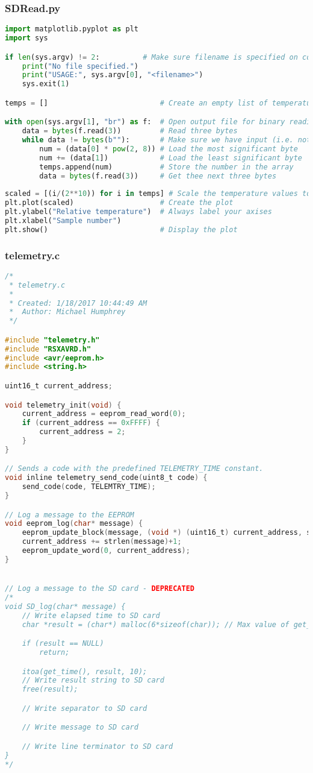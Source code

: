 \subsubsection{SDRead.py}
\begin{lstlisting}[language=Python]
import matplotlib.pyplot as plt
import sys

if len(sys.argv) != 2:			# Make sure filename is specified on command line
	print("No file specified.")	
	print("USAGE:", sys.argv[0], "<filename>")
	sys.exit(1)

temps = []							# Create an empty list of temperatures

with open(sys.argv[1], "br") as f:	# Open output file for binary reading
	data = bytes(f.read(3))			# Read three bytes
	while data != bytes(b""):		# Make sure we have input (i.e. not EOF)
		num = (data[0] * pow(2, 8))	# Load the most significant byte
		num += (data[1])			# Load the least significant byte
		temps.append(num)			# Store the number in the array
		data = bytes(f.read(3))		# Get thee next three bytes
	
scaled = [(i/(2**10)) for i in temps] # Scale the temperature values to between 0-1
plt.plot(scaled)					# Create the plot
plt.ylabel("Relative temperature")	# Always label your axises
plt.xlabel("Sample number")			
plt.show()							# Display the plot
\end{lstlisting}
\subsubsection{telemetry.c}
\begin{lstlisting}[language=C]
/*
 * telemetry.c
 *
 * Created: 1/18/2017 10:44:49 AM
 *  Author: Michael Humphrey
 */ 

#include "telemetry.h"
#include "RSXAVRD.h"
#include <avr/eeprom.h>
#include <string.h>

uint16_t current_address;

void telemetry_init(void) {
	current_address = eeprom_read_word(0);
	if (current_address == 0xFFFF) {
		current_address = 2;
	}
}

// Sends a code with the predefined TELEMETRY_TIME constant.
void inline telemetry_send_code(uint8_t code) {
	send_code(code, TELEMTRY_TIME);
}

// Log a message to the EEPROM
void eeprom_log(char* message) {
	eeprom_update_block(message, (void *) (uint16_t) current_address, strlen(message)+1);
	current_address += strlen(message)+1;
	eeprom_update_word(0, current_address);
}


// Log a message to the SD card - DEPRECATED
/*
void SD_log(char* message) {
	// Write elapsed time to SD card
	char *result = (char*) malloc(6*sizeof(char)); // Max value of get_time() is 65535, which is 5 characters, plus 1 for null terminator

	if (result == NULL)
		return;

	itoa(get_time(), result, 10);
	// Write result string to SD card
	free(result);

	// Write separator to SD card

	// Write message to SD card

	// Write line terminator to SD card
}
*/
\end{lstlisting}
